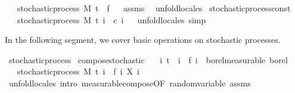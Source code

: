 \begin{isabellebody}
\ \ \ {\isachardoublequoteopen}stochastic{\isacharunderscore}{\kern0pt}process\ M\ t\ {\isacharparenleft}{\kern0pt}{\isasymlambda}{\isacharunderscore}{\kern0pt}{\isachardot}{\kern0pt}\ f{\isacharparenright}{\kern0pt}{\isachardoublequoteclose}%
\isadelimproof
\ %
\endisadelimproof
%
\isatagproof
{}\isamarkupfalse%
\ assms\ \isamarkupfalse%
\ {\isacharparenleft}{\kern0pt}unfold{\isacharunderscore}{\kern0pt}locales{\isacharparenright}{\kern0pt}%
\endisatagproof
{\isafoldproof}%
%
\isadelimproof
%
\endisadelimproof
\isanewline
\isanewline
{}\isamarkupfalse%
\ stochastic{\isacharunderscore}{\kern0pt}process{\isacharunderscore}{\kern0pt}const{\isacharcolon}{\kern0pt}\isanewline
\ \ \ {\isachardoublequoteopen}stochastic{\isacharunderscore}{\kern0pt}process\ M\ t\ {\isacharparenleft}{\kern0pt}{\isasymlambda}i\ {\isacharunderscore}{\kern0pt}{\isachardot}{\kern0pt}\ c\ i{\isacharparenright}{\kern0pt}{\isachardoublequoteclose}%
\isadelimproof
\ %
\endisadelimproof
%
\isatagproof
{}\isamarkupfalse%
\ {\isacharparenleft}{\kern0pt}unfold{\isacharunderscore}{\kern0pt}locales{\isacharparenright}{\kern0pt}\ simp%
\endisatagproof
{\isafoldproof}%
%
\isadelimproof
%
\endisadelimproof
%
\begin{isamarkuptext}%
In the following segment, we cover basic operations on stochastic processes.%
\end{isamarkuptext}\isamarkuptrue%
\isamarkupfalse%
\ stochastic{\isacharunderscore}{\kern0pt}process\isanewline
{}\isanewline
\isanewline
{}\isamarkupfalse%
\ compose{\isacharunderscore}{\kern0pt}stochastic{\isacharcolon}{\kern0pt}\isanewline
\ \ \ {\isachardoublequoteopen}{\isasymAnd}i{\isachardot}{\kern0pt}\ t\ {\isasymle}\ i\ {\isasymLongrightarrow}\ f\ i\ {\isasymin}\ borel{\isacharunderscore}{\kern0pt}measurable\ borel{\isachardoublequoteclose}\isanewline
\ \ \ {\isachardoublequoteopen}stochastic{\isacharunderscore}{\kern0pt}process\ M\ t\ {\isacharparenleft}{\kern0pt}{\isasymlambda}i\ {\isasymxi}{\isachardot}{\kern0pt}\ {\isacharparenleft}{\kern0pt}f\ i{\isacharparenright}{\kern0pt}\ {\isacharparenleft}{\kern0pt}X\ i\ {\isasymxi}{\isacharparenright}{\kern0pt}{\isacharparenright}{\kern0pt}{\isachardoublequoteclose}\isanewline
%
\isadelimproof
\ \ %
\endisadelimproof
%
\isatagproof
{}\isamarkupfalse%
\ {\isacharparenleft}{\kern0pt}unfold{\isacharunderscore}{\kern0pt}locales{\isacharparenright}{\kern0pt}\ {\isacharparenleft}{\kern0pt}intro\ measurable{\isacharunderscore}{\kern0pt}compose{\isacharbrackleft}{\kern0pt}OF\ random{\isacharunderscore}{\kern0pt}variable\ assms{\isacharbrackright}{\kern0pt}{\isacharparenright}{\kern0pt}%

\end{isabellebody}
